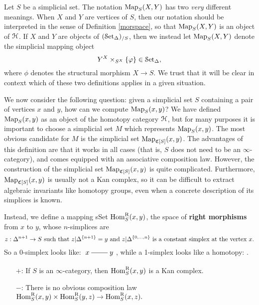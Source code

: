 \begin{1.2.2 Mapping spaces}
\begin{warning}
Let $S$ be a simplicial set. The notation $\operatorname{{Map}}_{S}( X, Y)$ has two {\em very} different meanings.
When $X$ and $Y$ are vertices of $S$, then our notation should be interpreted in the sense of Definition \ref{morspace}, so that $\operatorname{{Map}}_{S}(X,Y)$ is an object of $\operatorname{\mathcal{H}}$. If $X$ and $Y$ are objects of $(\operatorname{\mathcal{S}et_{\Delta}})_{/S}$, then we instead let $\operatorname{{Map}}_{S}(X,Y)$ denote the simplicial mapping object
$$ Y^{X} \times_{ S^{X} } \{ \varphi \} \in \operatorname{\mathcal{S}et_{\Delta}},$$
where $\phi$ denotes the structural morphism $X \rightarrow S$. We trust that it will be clear in context which of these two definitions applies in a given situation.
\end{warning}

We now consider the following question: given a simplicial set $S$ containing a pair of vertices $x$ and $y$, how can we compute $\operatorname{{Map}}_{S}(x,y)$? We have defined
$\operatorname{{Map}}_{S}(x,y)$ as an object of the homotopy category $\operatorname{\mathcal{H}}$, but for many purposes it is important to choose a simplicial set $M$ which represents $\operatorname{{Map}}_{S}(x,y)$. 
The most obvious candidate for $M$ is the simplicial set
$\operatorname{{Map}}_{\operatorname{\mathfrak{C}}[S]}(x,y)$. The advantages of this definition are that it works in all cases (that is, $S$ does not need to be an $\infty$-category), and comes equipped with an associative composition law. However, the construction of the simplicial set
$\operatorname{{Map}}_{\operatorname{\mathfrak{C}}[S]}(x,y)$ is quite complicated. Furthermore,
$\operatorname{{Map}}_{\operatorname{\mathfrak{C}}[S]}(x,y)$ is usually not a Kan complex, so it
can be difficult to extract algebraic invariants like homotopy
groups, even when a concrete description of its simplices is known. 
\begin{shaded}
Instead, we define a mapping sSet  $\operatorname{Hom}^{\operatorname{R}}_S(x,y)$, the space of \textbf{right morphisms} from $x$ to $y$, whose $n$-simplices are
\[\textup{$z: \Delta^{n+1} \rightarrow S$ such that $z| \Delta^{ \{n+1 \}} = y$ and $z|
\Delta^{ \{0, \ldots, n\} }$ is a constant simplex at the vertex
$x$.}\]
So a 0-simplex looks like: \!$\xymatrix@R=3mm@C=3mm{x\ar@{-}[rr]&&y}$\!, while a 1-simplex looks like a homotopy:
\!\!.
\begin{enumerate}\squishlist
\item[$+$:] If $S$ is an $\infty$-category, then $\operatorname{Hom}^{\operatorname{R}}_{S}(x,y)$ is a Kan complex.
\item[$-$:] There is no
obvious composition law
$\operatorname{Hom}^{\operatorname{R}}_{S}(x,y) \times \operatorname{Hom}^{\operatorname{R}}_{S}(y,z) \rightarrow \operatorname{Hom}^{\operatorname{R}}_{S}(x,z).$

\end{enumerate}
\end{shaded}
\end{1.2.2 Mapping spaces}
